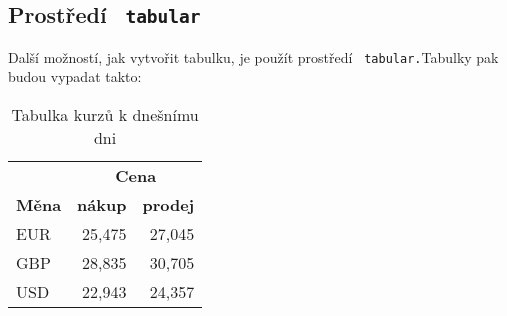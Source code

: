\documentclass[a4paper, 11pt]{article}
\begin{document}
    \subsection{Prostředí \texttt{ tabular}}
    Další možností, jak vytvořit tabulku, je použít prostředí \texttt{ tabular.}Tabulky pak budou vypadat takto\footnotemark{}:
    \bigskip
    \begin{table}[h] 
        \begin{center}
            \begin{tabular}{|l|r|r|} 
                \hline
                    & \multicolumn{2}{|c|}{\textbf{Cena}}\\ \cline{2-3}
                    \textbf{Měna} & \textbf{nákup} & \textbf{prodej}\\ \hline
                    EUR & 25,475 & 27,045\\
                    GBP & 28,835 & 30,705\\
                    USD & 22,943 & 24,357\\
                \hline
            \end{tabular}
        \caption{Tabulka kurzů k dnešnímu dni}
       \label{tubulka333}
        \end{center}
       
    \end{table}
    
\end{document}
